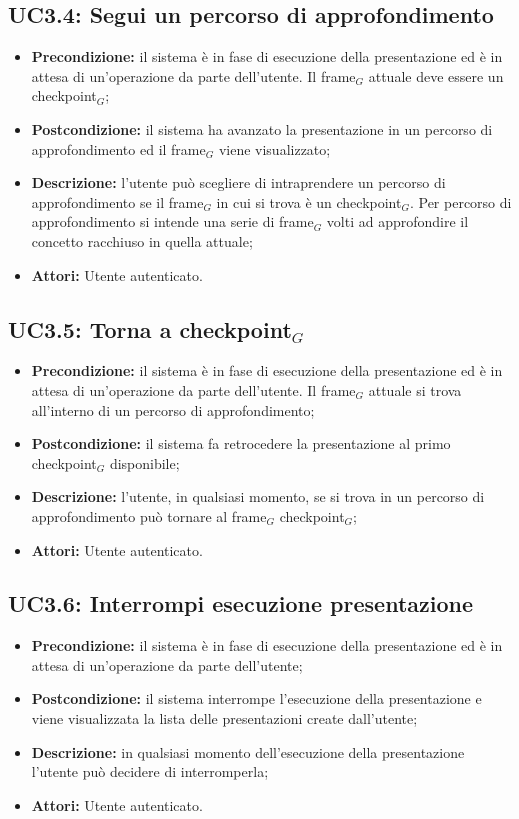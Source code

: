 \subsection{ UC3.4: Segui un percorso di approfondimento}

\begin{itemize}
	\item \textbf{Precondizione:} il sistema è in fase di esecuzione della presentazione ed è in attesa di un'operazione da parte dell'utente. Il frame$_G$ attuale deve essere un checkpoint$_G$;
	\item \textbf{Postcondizione:} il sistema ha avanzato la presentazione in un percorso di approfondimento ed il frame$_G$ viene visualizzato;
	\item \textbf{Descrizione:} l'utente può scegliere di intraprendere un percorso di approfondimento se il frame$_G$ in cui si trova è un checkpoint$_G$. Per percorso di approfondimento si intende una serie di frame$_G$ volti ad approfondire il concetto racchiuso in quella attuale;
	\item \textbf{Attori:} Utente autenticato.
\end{itemize}
\subsection{ UC3.5: Torna a checkpoint$_G$}

\begin{itemize}
	\item \textbf{Precondizione:} il sistema è in fase di esecuzione della presentazione ed è in attesa di un'operazione da parte dell'utente. Il frame$_G$ attuale si trova all'interno di un percorso di approfondimento;
	\item \textbf{Postcondizione:} il sistema fa retrocedere la presentazione al primo checkpoint$_G$ disponibile;
	\item \textbf{Descrizione:} l'utente, in qualsiasi momento, se si trova in un percorso di approfondimento può tornare al frame$_G$ checkpoint$_G$;
	\item \textbf{Attori:} Utente autenticato.
\end{itemize}
\subsection{ UC3.6: Interrompi esecuzione presentazione}

\begin{itemize}
	\item \textbf{Precondizione:} il sistema è in fase di esecuzione della presentazione ed è in attesa di un'operazione da parte dell'utente;
	\item \textbf{Postcondizione:} il sistema interrompe l'esecuzione della presentazione e viene visualizzata la lista delle presentazioni create dall'utente;
	\item \textbf{Descrizione:} in qualsiasi momento dell'esecuzione della presentazione l'utente può decidere di interromperla;
	\item \textbf{Attori:} Utente autenticato.
\end{itemize}
